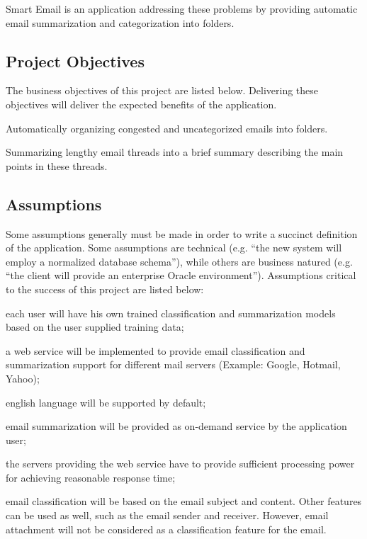 \documentclass[a4paper,10pt]{article}
\newenvironment{my_itemize}
{\begin{itemize}
  \setlength{\itemsep}{0cm}
  \setlength{\parskip}{0cm}}
{\end{itemize}}
\begin{document}
Smart Email is an application addressing these problems by providing automatic 
email summarization and categorization into folders.

\subsection{Project Objectives}
The business objectives of this project are listed below. Delivering these 
objectives will deliver the expected benefits of the application.
\begin{my_itemize}
  \item Automatically organizing congested and uncategorized emails into folders.
  \item Summarizing lengthy email threads into a brief summary describing the 
	main points in these threads.
\end{my_itemize}


\subsection{Assumptions}
Some assumptions generally must be made in order to write a succinct definition 
of the application. Some assumptions are technical (e.g. ``the new system will 
employ a normalized database schema''), while others are business natured (e.g. 
``the client will provide an enterprise Oracle environment'').  Assumptions 
critical to the success of this project are listed below:
\begin{my_itemize}
  \item each user will have his own trained classification and summarization 
	models based on the user supplied training data;
  \item a web service will be implemented to provide email 
	classification and summarization support for different mail 
	servers (Example: Google, Hotmail, Yahoo);
  \item english language will be supported by default;
  \item email summarization will be provided as on-demand service by the application user;
  \item the servers providing the web service have to provide sufficient 
	processing power for achieving reasonable response time;
  \item email classification will be based on the email subject and content. 
	Other features can be used as well, such as the email sender and receiver. 
	However, email attachment will not be considered as a classification feature for the email.
\end{my_itemize}
\end{document}
